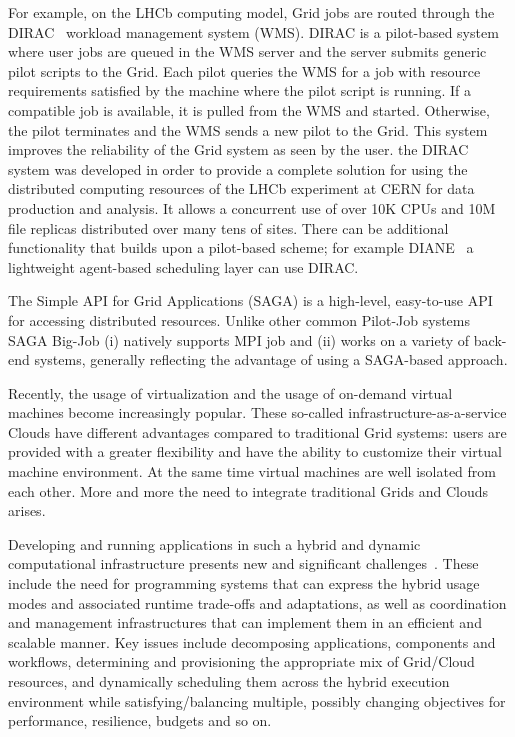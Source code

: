 \documentclass[conference,final]{IEEEtran}
\begin{document}
For example, on the LHCb computing model, Grid jobs are routed through
the DIRAC~\cite{dirac} workload management system (WMS). DIRAC is a
pilot-based system where user jobs are queued in the WMS server and
the server submits generic pilot scripts to the Grid. Each pilot
queries the WMS for a job with resource requirements satisfied by the
machine where the pilot script is running. If a compatible job is
available, it is pulled from the WMS and started. Otherwise, the pilot
terminates and the WMS sends a new pilot to the Grid. This system
improves the reliability of the Grid system as seen by the user.  the
DIRAC system was developed in order to provide a complete solution for
using the distributed computing resources of the LHCb experiment at
CERN for data production and analysis. It allows a concurrent use of
over 10K CPUs and 10M file replicas distributed over many tens of
sites.  There can be additional functionality that builds upon a
pilot-based scheme; for example DIANE~\cite{diane} a lightweight
agent-based scheduling layer can use DIRAC.

The Simple API for Grid Applications (SAGA) is a high-level,
easy-to-use API for accessing distributed resources. Unlike other
common Pilot-Job systems SAGA Big-Job (i) natively supports MPI job and
(ii) works on a variety of back-end systems, generally reflecting the
advantage of using a SAGA-based approach.

Recently, the usage of virtualization and the usage of on-demand
virtual machines become increasingly popular. These so-called
infrastructure-as-a-service Clouds have different advantages compared
to traditional Grid systems: users are provided with a greater
flexibility and have the ability to customize their virtual machine
environment. At the same time virtual machines are well isolated from
each other. More and more the need to integrate traditional Grids and
Clouds arises.

Developing and running applications in such a hybrid and dynamic
computational infrastructure presents new and significant
challenges~\cite{cloud-grid-autonomics}. These include the need for
programming systems that can express the hybrid usage modes and
associated runtime trade-offs and adaptations, as well as coordination
and management infrastructures that can implement them in an efficient
and scalable manner. Key issues include decomposing applications,
components and workflows, determining and provisioning the appropriate
mix of Grid/Cloud resources, and dynamically scheduling them across
the hybrid execution environment while satisfying/balancing multiple,
possibly changing objectives for performance, resilience, budgets and
so on.
\end{document}
